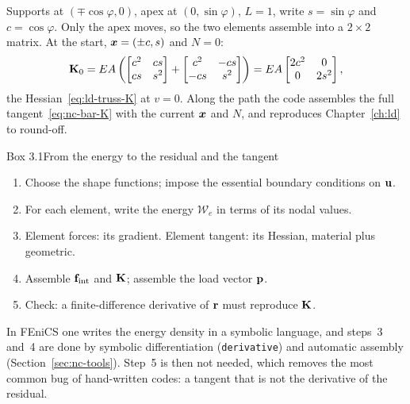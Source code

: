 \begin{example}\label{ex:nc-truss-fe}
Supports at $(\mp\cos\varphi, 0)$, apex at $(0,\sin\varphi)$, $L = 1$, write $s = \sin\varphi$
and $c = \cos\varphi$. Only the apex moves, so the two elements assemble into a
$2\times2$ matrix. At the start, $\bm{x} = (\pm c, s)$ and $N = 0$:
\begin{equation}\label{eq:nc-truss-K0}
  \mathbf{K}_0 = EA\left(\begin{bmatrix} c^2 & cs\\ cs & s^2\end{bmatrix}
  + \begin{bmatrix} c^2 & -cs\\ -cs & s^2\end{bmatrix}\right)
  = EA\begin{bmatrix} 2c^2 & 0\\ 0 & 2s^2\end{bmatrix},
\end{equation}
the Hessian~\eqref{eq:ld-truss-K} at $v = 0$. Along the path the code assembles the full
tangent~\eqref{eq:nc-bar-K} with the current $\bm{x}$ and $N$, and reproduces Chapter~\ref{ch:ld}
to round-off.
\end{example}

\begin{gbox}{Box 3.1\quad From the energy to the residual and the tangent}\label{sec:nc-box-fe}
%
\begin{enumerate}
  \item Choose the shape functions; impose the essential boundary conditions on $\mathbf{u}$.
  \item For each element, write the energy $\mathcal{W}_e$ in terms of its nodal values.
  \item Element forces: its gradient. Element tangent: its Hessian, material plus geometric.
  \item Assemble $\mathbf{f}_{\mathrm{int}}$ and $\mathbf{K}$; assemble the load vector $\mathbf{p}$.
  \item Check: a finite-difference derivative of $\mathbf{r}$ must reproduce $\mathbf{K}$.
\end{enumerate}
\end{gbox}

In FEniCS one writes the energy density in a symbolic language, and steps~3 and~4 are
done by symbolic differentiation (\texttt{derivative}) and automatic assembly
(Section~\ref{sec:nc-tools}). Step~5 is then not needed, which removes the most common bug
of hand-written codes: a tangent that is not the derivative of the residual.


